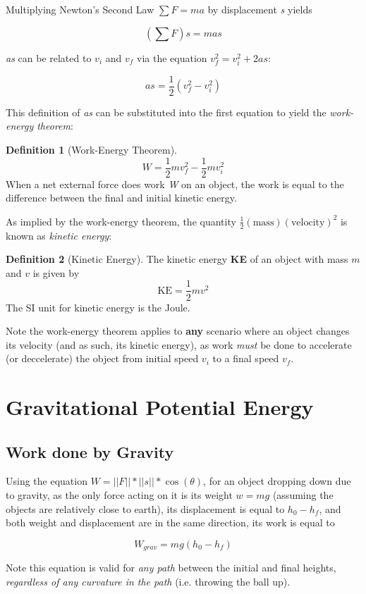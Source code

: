 \documentclass[12pt, a4paper]{article}
\theoremstyle{definition}
\newtheorem{definition}{Definition}
\begin{document}
Multiplying Newton's Second Law $\sum F = ma$ by displacement \emph{s} yields

\[(\sum F)s = mas\]

\emph{as} can be related to $v_i$ and $v_f$ via the equation $v_f^2 = v_i^2 + 2as$:

\[as = \frac{1}{2}(v_f^2 - v_i^2)\]

This definition of \emph{as} can be substituted into the first equation to yield the \emph{work-energy theorem}:

\begin{definition}[Work-Energy Theorem]
\[W = \frac{1}{2}mv_f^2 - \frac{1}{2}mv_i^2\]
When a net external force does work \emph{W} on an object, the work is equal to the difference between the final and initial kinetic energy. 
\end{definition}

As implied by the work-energy theorem, the quantity $\frac{1}{2}\mathrm{(mass)(velocity)^2}$ is known as \emph{kinetic energy}:

\begin{definition}[Kinetic Energy]
The kinetic energy \textbf{KE} of an object with mass $m$ and $v$ is given by
\[\mathrm{KE} = \frac{1}{2}mv^2\]
The SI unit for kinetic energy is the Joule.
\end{definition}

Note the work-energy theorem applies to \textbf{any} scenario where an object changes its velocity (and as such, its kinetic energy), as work \emph{must} be done to accelerate (or deccelerate) the object from initial speed $v_i$ to a final speed $v_f$. 

\newpage

\section{Gravitational Potential Energy}
\subsection{Work done by Gravity}
Using the equation $W = ||F|| * ||s|| * \cos(\theta)$, for an object dropping down due to gravity, as the only force acting on it is its weight $w = mg$ (assuming the objects are relatively close to earth),
its displacement is equal to $h_0 - h_f$, and both weight and displacement are in the same direction, its work is equal to

\[W_{grav} = mg(h_0 - h_f)\]

Note this equation is valid for \emph{any path} between the initial and final heights, \emph{regardless of any curvature in the path} (i.e. throwing the ball up).
\end{document}
